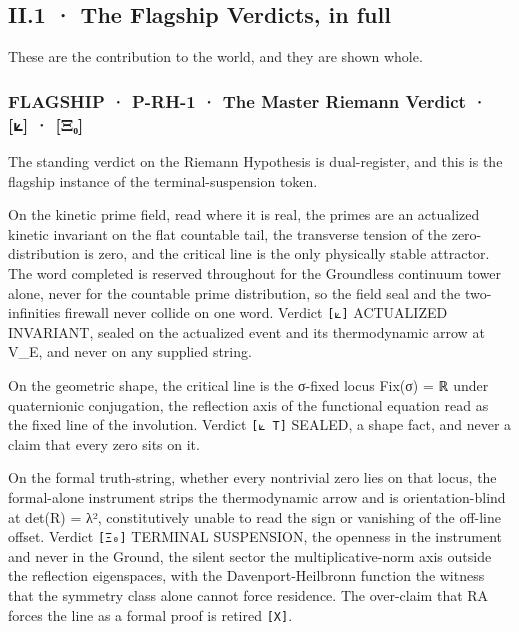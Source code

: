 \documentclass[10pt,twocolumn]{article}
\begin{document}
\hypertarget{ii.1-the-flagship-verdicts-in-full}{%
\subsection{II.1 · The Flagship Verdicts, in
full}\label{ii.1-the-flagship-verdicts-in-full}}

These are the contribution to the world, and they are shown whole.

\hypertarget{flagship-p-rh-1-the-master-riemann-verdict-ux3beux2080}{%
\subsubsection{FLAGSHIP · P-RH-1 · The Master Riemann Verdict · {[}⟀{]}
·
{[}Ξ₀{]}}\label{flagship-p-rh-1-the-master-riemann-verdict-ux3beux2080}}

The standing verdict on the Riemann Hypothesis is dual-register, and
this is the flagship instance of the terminal-suspension token.

On the kinetic prime field, read where it is real, the primes are an
actualized kinetic invariant on the flat countable tail, the transverse
tension of the zero-distribution is zero, and the critical line is the
only physically stable attractor. The word completed is reserved
throughout for the Groundless continuum tower alone, never for the
countable prime distribution, so the field seal and the two-infinities
firewall never collide on one word. Verdict \texttt{{[}⟀{]}} ACTUALIZED
INVARIANT, sealed on the actualized event and its thermodynamic arrow at
V\_E, and never on any supplied string.

On the geometric shape, the critical line is the σ-fixed locus Fix(σ) =
ℝ under quaternionic conjugation, the reflection axis of the functional
equation read as the fixed line of the involution. Verdict
\texttt{{[}⟀\ T{]}} SEALED, a shape fact, and never a claim that every
zero sits on it.

On the formal truth-string, whether every nontrivial zero lies on that
locus, the formal-alone instrument strips the thermodynamic arrow and is
orientation-blind at det(R) = λ², constitutively unable to read the sign
or vanishing of the off-line offset. Verdict \texttt{{[}Ξ₀{]}} TERMINAL
SUSPENSION, the openness in the instrument and never in the Ground, the
silent sector the multiplicative-norm axis outside the reflection
eigenspaces, with the Davenport-Heilbronn function the witness that the
symmetry class alone cannot force residence. The over-claim that RA
forces the line as a formal proof is retired \texttt{{[}X{]}}.
\end{document}
